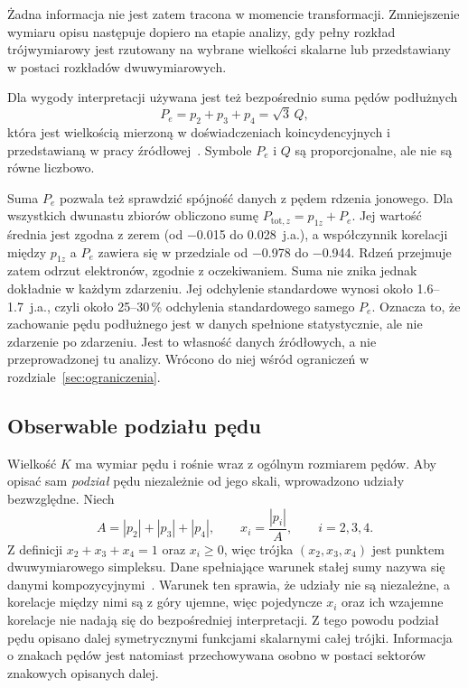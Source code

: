 \documentclass[12pt,a4paper]{article}
\newcommand{\ja}{j.a.}
\begin{document}
Żadna informacja nie jest zatem tracona w momencie transformacji. Zmniejszenie wymiaru opisu następuje dopiero na etapie analizy, gdy pełny rozkład trójwymiarowy jest rzutowany na wybrane wielkości skalarne lub przedstawiany w postaci rozkładów dwuwymiarowych.

Dla wygody interpretacji używana jest też bezpośrednio suma pędów
podłużnych
\begin{equation}
P_e=p_2+p_3+p_4=\sqrt3\,Q,
\label{eq:Pe}
\end{equation}
która jest wielkością mierzoną w doświadczeniach koincydencyjnych
i przedstawianą w pracy źródłowej~\cite{Emmanouilidou2023}. Symbole
$P_e$ i $Q$ są proporcjonalne, ale nie są równe liczbowo.

Suma $P_e$ pozwala też sprawdzić spójność danych z pędem rdzenia
jonowego. Dla wszystkich dwunastu zbiorów obliczono sumę
$P_{\mathrm{tot},z}=p_{1z}+P_e$. Jej wartość średnia jest zgodna z zerem
(od \num{-0.015} do \num{+0.028}~\ja), a współczynnik korelacji między
$p_{1z}$ a $P_e$ zawiera się w przedziale od \num{-0.978} do
\num{-0.944}. Rdzeń przejmuje zatem odrzut elektronów, zgodnie
z oczekiwaniem. Suma nie znika jednak dokładnie w każdym zdarzeniu. Jej
odchylenie standardowe wynosi około \num{1.6}--\num{1.7}~\ja, czyli około
\num{25}--\num{30}\,\% odchylenia standardowego samego $P_e$. Oznacza to,
że zachowanie pędu podłużnego jest w danych spełnione statystycznie, ale
nie zdarzenie po zdarzeniu. Jest to własność danych źródłowych, a nie
przeprowadzonej tu analizy. Wrócono do niej wśród ograniczeń
w rozdziale~\ref{sec:ograniczenia}.

\subsection{Obserwable podziału pędu}
\label{sec:obserwable}

Wielkość $K$ ma wymiar pędu i rośnie wraz z ogólnym rozmiarem
pędów. Aby opisać sam \emph{podział} pędu niezależnie od jego
skali, wprowadzono udziały bezwzględne. Niech
\begin{equation}
A=|p_2|+|p_3|+|p_4|,\qquad x_i=\frac{|p_i|}{A},\qquad i=2,3,4 .
\label{eq:udzialy}
\end{equation}
Z definicji $x_2+x_3+x_4=1$ oraz $x_i\ge 0$, więc trójka
$(x_2,x_3,x_4)$ jest punktem dwuwymiarowego simpleksu. Dane spełniające
warunek stałej sumy nazywa się danymi kompozycyjnymi~\cite{Aitchison1986}.
Warunek ten sprawia, że udziały nie są niezależne, a korelacje między
nimi są z góry ujemne, więc pojedyncze $x_i$ oraz ich wzajemne
korelacje nie nadają się do bezpośredniej interpretacji. Z tego powodu
podział pędu opisano dalej symetrycznymi funkcjami skalarnymi całej
trójki. Informacja o znakach pędów jest natomiast przechowywana osobno w postaci sektorów znakowych opisanych dalej.
\end{document}
